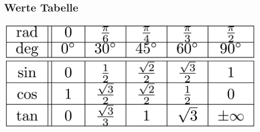 \subsection{Werte Tabelle}
    \begin{center}
        \includegraphics[width=0.7\linewidth]{src/4_Trigonometrie/trigo_tabelle.pdf}
    \end{center}